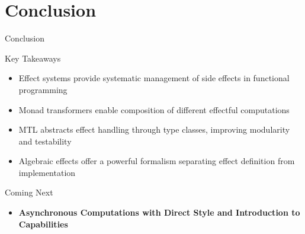 \documentclass[presentation, 10pt]{beamer}\mode<presentation>{\usetheme{metropolis}}
\begin{document}
\section{Conclusion}
\begin{frame}{Conclusion}
	\begin{alertblock}{Key Takeaways}
		\begin{itemize}
			\item Effect systems provide systematic management of side effects in functional programming
			\item Monad transformers enable composition of different effectful computations
			\item MTL abstracts effect handling through type classes, improving modularity and testability
			\item Algebraic effects offer a powerful formalism separating effect definition from implementation
		\end{itemize}
	\end{alertblock}
	
	\begin{exampleblock}{Coming Next}
		\begin{itemize}
		\item 
		\textbf{Asynchronous Computations with Direct Style and Introduction to Capabilities}
		\end{itemize}
	\end{exampleblock}
\end{frame}
\frame{\titlepage}




\end{document}
